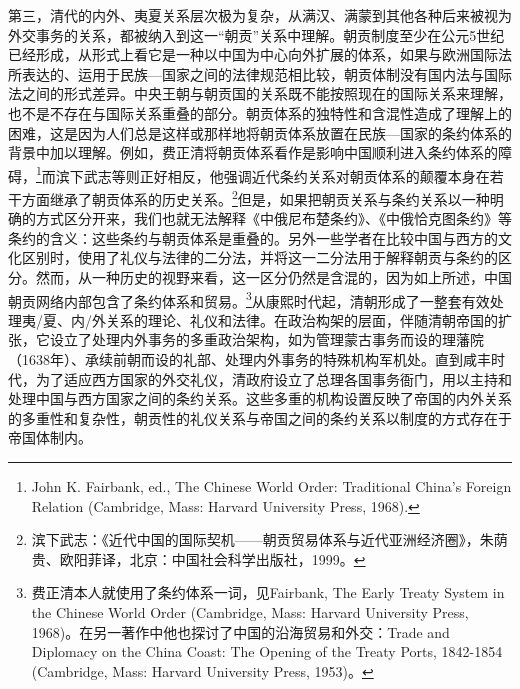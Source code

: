 \documentclass[a4paper, 12pt, openright]{ctexbook}
\begin{document}
第三，清代的内外、夷夏关系层次极为复杂，从满汉、满蒙到其他各种后来被视为外交事务的关系，都被纳入到这一“朝贡”关系中理解。朝贡制度至少在公元5世纪已经形成，从形式上看它是一种以中国为中心向外扩展的体系，如果与欧洲国际法所表达的、运用于民族—国家之间的法律规范相比较，朝贡体制没有国内法与国际法之间的形式差异。中央王朝与朝贡国的关系既不能按照现在的国际关系来理解，也不是不存在与国际关系重叠的部分。朝贡体系的独特性和含混性造成了理解上的困难，这是因为人们总是这样或那样地将朝贡体系放置在民族—国家的条约体系的背景中加以理解。例如，费正清将朝贡体系看作是影响中国顺利进入条约体系的障碍，\footnote{John K. Fairbank, ed., The Chinese World Order: Traditional China's Foreign Relation (Cambridge, Mass: Harvard University Press, 1968).}而滨下武志等则正好相反，他强调近代条约关系对朝贡体系的颠覆本身在若干方面继承了朝贡体系的历史关系。\footnote{滨下武志：《近代中国的国际契机——朝贡贸易体系与近代亚洲经济圈》，朱荫贵、欧阳菲译，北京：中国社会科学出版社，1999。}但是，如果把朝贡关系与条约关系以一种明确的方式区分开来，我们也就无法解释《中俄尼布楚条约》、《中俄恰克图条约》等条约的含义：这些条约与朝贡体系是重叠的。另外一些学者在比较中国与西方的文化区别时，使用了礼仪与法律的二分法，并将这一二分法用于解释朝贡与条约的区分。然而，从一种历史的视野来看，这一区分仍然是含混的，因为如上所述，中国朝贡网络内部包含了条约体系和贸易。\footnote{费正清本人就使用了条约体系一词，见Fairbank, The Early Treaty System in the Chinese World Order (Cambridge, Mass: Harvard University Press, 1968)。在另一著作中他也探讨了中国的沿海贸易和外交：Trade and Diplomacy on the China Coast: The Opening of the Treaty Ports, 1842-1854 (Cambridge, Mass: Harvard University Press, 1953)。}从康熙时代起，清朝形成了一整套有效处理夷/夏、内/外关系的理论、礼仪和法律。在政治构架的层面，伴随清朝帝国的扩张，它设立了处理内外事务的多重政治架构，如为管理蒙古事务而设的理藩院（1638年）、承续前朝而设的礼部、处理内外事务的特殊机构军机处。直到咸丰时代，为了适应西方国家的外交礼仪，清政府设立了总理各国事务衙门，用以主持和处理中国与西方国家之间的条约关系。这些多重的机构设置反映了帝国的内外关系的多重性和复杂性，朝贡性的礼仪关系与帝国之间的条约关系以制度的方式存在于帝国体制内。
\end{document}
